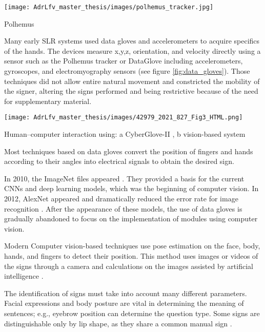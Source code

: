 \begin{marginfigure}
    \centering
    \texttt{[image: AdrLfv\_master\_thesis/images/polhemus\_tracker.jpg]}
    \caption{Polhemus}
    \label{fig:Polhemus}
\end{marginfigure}

Many early SLR systems used data gloves and accelerometers to acquire specifics of the hands. The devices measure x,y,z, orientation, and velocity directly using a sensor such as the Polhemus tracker \cite{413199} \cite{5738842} or DataGlove \cite{Kadous1970} \cite{Metaxas1970} including accelerometers, gyroscopes, and electromyography sensors  (see figure \ref{fig:data_gloves}). Those techniques did not allow entire natural movement and constricted the mobility of the signer, altering the signs performed and being restrictive because of the need for supplementary material.

\begin{marginfigure}
    \centering
    \texttt{[image: AdrLfv\_master\_thesis/images/42979\_2021\_827\_Fig3\_HTML.png]}
    \caption{Human–computer interaction using: a CyberGlove-II \cite{cyberglovesystems}, b vision-based system}
    \label{fig:data_gloves}
\end{marginfigure}

Most techniques based on data gloves convert the position of fingers and hands according to their angles into electrical signals to obtain the desired sign. 

In 2010, the ImageNet files appeared \cite{li2010crowdsourcing}. They provided a basis for the current CNNs and deep learning models, which was the beginning of computer vision. In 2012, AlexNet appeared and dramatically reduced the error rate for image recognition \cite{alom2018history}. After the appearance of these models, the use of data gloves is gradually abandoned to focus on the implementation of modules using computer vision.

Modern Computer vision-based techniques use pose estimation on the face, body, hands, and fingers to detect their position. This method uses images or videos of the signs through a camera and calculations on the images assisted by artificial intelligence \cite{adeyanju2021machine}. 

The identification of signs must take into account many different parameters. Facial expressions and body posture are vital in determining the meaning of sentences; e.g., eyebrow position can determine the question type. Some signs are distinguishable only by lip shape, as they share a common manual sign \cite{cooper2011sign}. 


